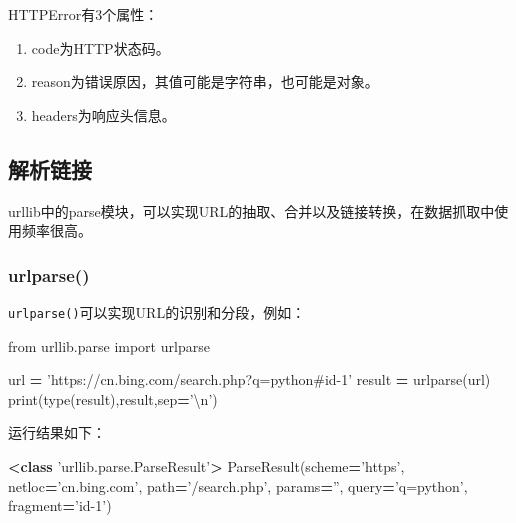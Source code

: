 \documentclass[]{ctexbook}
\newenvironment{Shaded}{\begin{snugshade}}{\end{snugshade}}
\newcommand{\BuiltInTok}[1]{#1}
\newcommand{\CharTok}[1]{\textcolor[rgb]{0.31,0.60,0.02}{#1}}
\newcommand{\ImportTok}[1]{#1}
\newcommand{\KeywordTok}[1]{\textcolor[rgb]{0.13,0.29,0.53}{\textbf{#1}}}
\newcommand{\NormalTok}[1]{#1}
\newcommand{\OperatorTok}[1]{\textcolor[rgb]{0.81,0.36,0.00}{\textbf{#1}}}
\newcommand{\StringTok}[1]{\textcolor[rgb]{0.31,0.60,0.02}{#1}}
\providecommand{\tightlist}{%
  \setlength{\itemsep}{0pt}\setlength{\parskip}{0pt}}
\begin{document}
HTTPError有3个属性：

\begin{enumerate}
\def\labelenumi{\arabic{enumi}.}
\tightlist
\item
  code为HTTP状态码。
\item
  reason为错误原因，其值可能是字符串，也可能是对象。
\item
  headers为响应头信息。
\end{enumerate}

\hypertarget{ux89e3ux6790ux94feux63a5}{%
\subsection{解析链接}\label{ux89e3ux6790ux94feux63a5}}

urllib中的parse模块，可以实现URL的抽取、合并以及链接转换，在数据抓取中使用频率很高。

\hypertarget{urlparse}{%
\subsubsection{urlparse()}\label{urlparse}}

\texttt{urlparse()}可以实现URL的识别和分段，例如：

\begin{Shaded}
\begin{Highlighting}[]
\ImportTok{from}\NormalTok{ urllib.parse }\ImportTok{import}\NormalTok{ urlparse}

\NormalTok{url }\OperatorTok{=} \StringTok{'https://cn.bing.com/search.php?q=python#id-1'}
\NormalTok{result }\OperatorTok{=}\NormalTok{ urlparse(url)}
\BuiltInTok{print}\NormalTok{(}\BuiltInTok{type}\NormalTok{(result),result,sep}\OperatorTok{=}\StringTok{'}\CharTok{\textbackslash{}n}\StringTok{'}\NormalTok{)}
\end{Highlighting}
\end{Shaded}

运行结果如下：

\begin{Shaded}
\begin{Highlighting}[]
\OperatorTok{<}\KeywordTok{class} \StringTok{'urllib.parse.ParseResult'}\OperatorTok{>}
\NormalTok{ParseResult(scheme}\OperatorTok{=}\StringTok{'https'}\NormalTok{, netloc}\OperatorTok{=}\StringTok{'cn.bing.com'}\NormalTok{, path}\OperatorTok{=}\StringTok{'/search.php'}\NormalTok{, params}\OperatorTok{=}\StringTok{''}\NormalTok{, query}\OperatorTok{=}\StringTok{'q=python'}\NormalTok{, fragment}\OperatorTok{=}\StringTok{'id-1'}\NormalTok{)}
\end{Highlighting}
\end{Shaded}
\end{document}
